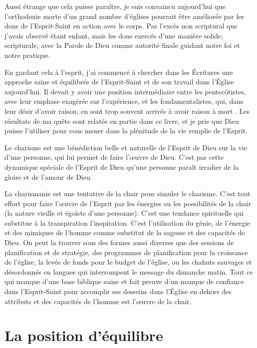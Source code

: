 Aussi étrange que cela puisse paraître, je suis convaincu aujourd'hui que l'orthodoxie morte d'un grand nombre d'églises pourrait être améliorée par les dons de l'Esprit-Saint en action avec le corps. Pas l'excès non scriptural que j'avais observé étant enfant, mais les dons exercés d'une manière solide, scripturale, avec la Parole de Dieu comme autorité finale guidant notre foi et notre pratique.

En gardant cela à l'esprit, j'ai commencé à chercher dans les Écritures une approche saine et équilibrée de l'Esprit-Saint et de son travail dans l'Église aujourd'hui. Il devait y avoir une position intermédiaire entre les pentecôtistes, avec leur emphase exagérée sur l'expérience, et les fondamentalistes, qui, dans leur désir d'avoir raison, en sont trop souvent arrivés à avoir raison à mort . Les résultats de ma quête sont relatés en partie dans ce livre, et je prie que Dieu puisse l'utiliser pour vous mener dans la plénitude de la vie remplie de l'Esprit.

Le charisme est une bénédiction belle et naturelle de l'Esprit de Dieu sur la vie d'une personne, qui lui permet de faire l'œuvre de Dieu. C'est par cette dynamique spéciale de l'Esprit de Dieu qu'une personne paraît irradier de la gloire et de l'amour de Dieu.

La charismanie est une tentative de la chair pour simuler le charisme. C'est tout effort pour faire l'œuvre de l'Esprit par les énergies ou les possibilités de la chair (la nature vieille et égoïste d'une personne). C'est une tendance spirituelle qui substitue à la transpiration l'inspiration. C'est l'utilisation du génie, de l'énergie et des mimiques de l'homme comme substitut de la sagesse et des capacités de Dieu. On peut la trouver sous des formes aussi diverses que des sessions de planification et de stratégie, des programmes de planification pour la croissance de l'église, la levée de fonds pour le budget de l'église, ou les chahuts sauvages et désordonnés en langues qui interrompent le message du dimanche matin. Tout ce qui manque d'une base biblique saine et fait preuve d'un manque de confiance dans l'Esprit-Saint pour accomplir ses desseins dans l'Église en dehors des attributs et des capacités de l'homme est l'œuvre de la chair.

\section{La position d'équilibre}

